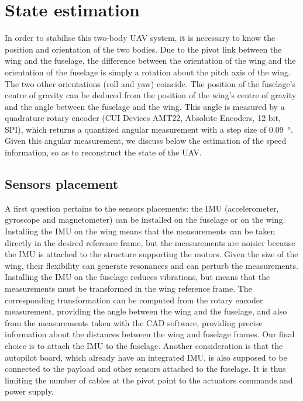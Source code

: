 \section{State estimation}\label{sec:stateEst}
In order to stabilise this two-body UAV system, it is necessary to know the position and orientation of the two bodies. Due to the pivot link between the wing and the fuselage, the difference between the orientation of the wing and the orientation of the fuselage is simply a rotation about the pitch axis of the wing. The two other orientations (roll and yaw) coincide. The position of the fuselage's centre of gravity can be deduced from the position of the wing's centre of gravity and the angle between the fuselage and the wing. This angle is measured by a quadrature rotary encoder (CUI Devices AMT22, Absolute Encoders, 12 bit, SPI), which returns a quantized angular measurement with a step size of \SI{0.09}{\degree}. Given this angular measurement, we discuss below the estimation of the speed information, so as to reconstruct the state of the UAV. 

\subsection{Sensors placement}
\label{subsec:sens_pos}
A first question pertains to the sensors placements: the IMU (accelerometer, gyroscope and magnetometer) can be installed on the fuselage or on the wing. 
Installing the IMU on the wing means that the measurements can be taken directly in the desired reference frame, but the measurements are noisier because the IMU is attached to the structure supporting the motors. Given the size of the wing, their flexibility can generate resonances and can perturb the measurements. 
Installing the IMU on the fuselage reduces vibrations, but means that the measurements must be transformed in the wing reference frame. The corresponding transformation can be computed from the rotary encoder measurement, providing the angle between the wing and the fuselage, and also from the measurements taken with the CAD software, providing precise information about the distances between the wing and fuselage frames. Our final choice is to attach the IMU to the fuselage. Another consideration is that the autopilot board, which already have an integrated IMU, is also supposed to be connected to the payload and other sensors attached to the fuselage. It is thus limiting the number of cables at the pivot point to the actuators commands and power supply.

